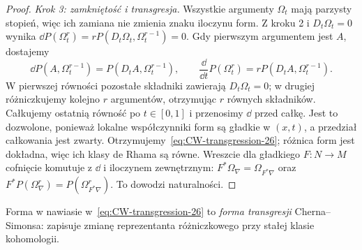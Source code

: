 \begin{proof}
\emph{Krok 3: zamkniętość i transgresja.}
Wszystkie argumenty $\Omega_t$ mają parzysty stopień,
więc ich zamiana nie zmienia znaku iloczynu form.
Z kroku 2 i $D_t\Omega_t=0$ wynika
$\dd P(\Omega_t^r)=rP(D_t\Omega_t,\Omega_t^{r-1})=0$.
Gdy pierwszym argumentem jest $A$, dostajemy
\[
 \dd P(A,\Omega_t^{r-1})=P(D_tA,\Omega_t^{r-1}),\qquad
 \frac{\dd}{\dd t}P(\Omega_t^r)
 =rP(D_tA,\Omega_t^{r-1}).
\]
W pierwszej równości pozostałe składniki zawierają
$D_t\Omega_t=0$; w drugiej różniczkujemy kolejno $r$ argumentów,
otrzymując $r$ równych składników.
Całkujemy ostatnią równość po $t\in[0,1]$
i przenosimy $\dd$ przed całkę.
Jest to dozwolone, ponieważ lokalne współczynniki form
są gładkie w $(x,t)$, a przedział całkowania jest zwarty.
Otrzymujemy~\eqref{eq:CW-transgression-26};
różnica form jest dokładna, więc ich klasy de Rhama są równe.
Wreszcie dla gładkiego $F:N\to M$ cofnięcie komutuje
z $\dd$ i iloczynem zewnętrznym:
$F^*\Omega_\nabla=\Omega_{F^*\nabla}$ oraz
$F^*P(\Omega_\nabla^r)=P(\Omega_{F^*\nabla}^r)$.
To dowodzi naturalności.
\end{proof}

Forma w nawiasie w~\eqref{eq:CW-transgression-26}
to \emph{forma transgresji} Cherna--Simonsa:
zapisuje zmianę reprezentanta różniczkowego
przy stałej klasie kohomologii.

